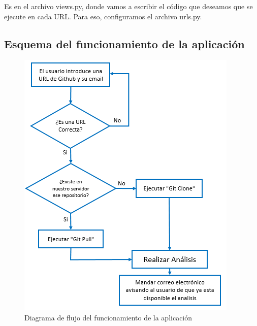 \documentclass[a4paper, 12pt]{book}
\begin{document}
Es en el archivo views.py, donde vamos a escribir el código que deseamos que se ejecute en cada URL. Para eso, configuramos el archivo urls.py.

\newpage
\subsection{Esquema del funcionamiento de la aplicación}
\begin{figure}[H]
\centering
\includegraphics[scale=0.9]{img/DiagramaFlujoTFG1.png} 
\caption{Diagrama de flujo del funcionamiento de la aplicación}
\end{figure}
\end{document}

